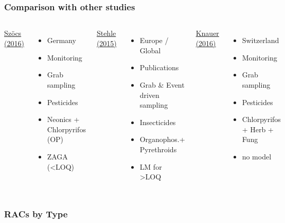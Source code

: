 \documentclass[
	10pt
	]{beamer}
\begin{document}
\begin{frame}
\frametitle{Comparison with other studies}
	\begin{columns}[T]
	    \underline{Szöcs (2016)}
	    \begin{itemize}
        	\item Germany
        	\item Monitoring
        	\item Grab sampling \vspace{1.2em}
        	\item Pesticides
        	\item Neonics + Chlorpyrifos (OP)
        	\item ZAGA (\textless LOQ)
        \end{itemize}
	    \underline{Stehle (2015)}
	    \begin{itemize}
        	\item Europe / Global
        	\item Publications
        	\item Grab \& Event driven sampling
        	\item Insecticides
        	\item Organophos.+ Pyrethroids
        	\item LM for \textgreater LOQ
        \end{itemize}
	    \underline{Knauer (2016)}
	    \begin{itemize}
        	\item Switzerland
        	\item Monitoring
        	\item Grab sampling \vspace{1.2em}
        	\item Pesticides
        	\item Chlorpyrifos + Herb + Fung
        	\item no model
        \end{itemize}
	\end{columns}
\end{frame}


\begin{frame}
\frametitle{RACs by Type}
	\begin{adjustbox}{max totalsize={\textwidth}{0.95\textheight}}
				
	\end{adjustbox}
\end{frame}
\end{document}
